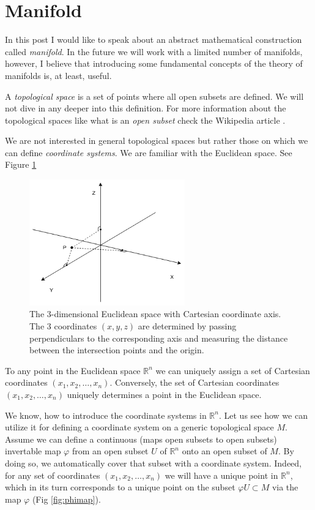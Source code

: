 \documentclass[a4paper,10pt]{article}
\title{}
\author{}
\begin{document}
\section{Manifold}

In this post I would like to speak about an abstract mathematical construction called {\it manifold}. In the future we will work with a limited number of manifolds, however, I believe that introducing some fundamental concepts of the theory of manifolds is, at least, useful. 

A {\it topological space } is a set of points where all open subsets  are defined. We will not dive in any deeper into this definition. For more information about the topological spaces like what is an {\it open subset} check the Wikipedia article \cite{topspace}. 

We are not interested in general topological spaces but rather those on which we can define {\it coordinate systems}. We are familiar with the Euclidean space. See Figure \ref{fig:3dcart}

\begin{figure}[h]
\centering
 \includegraphics[width=0.6\textwidth]{../../images/3DEuclidean.png}
 \caption{The 3-dimensional Euclidean space with Cartesian coordinate axis. The 3 coordinates $(x,y,z)$ are determined by passing perpendiculars to the corresponding axis and measuring the distance between the intersection points and the origin. }
 \label{fig:3dcart}
\end{figure}
 
To any point in the Euclidean space $\mathbb{R}^n$  we can uniquely assign a set of Cartesian coordinates $(x_1, x_2,\ldots, x_n)$. Conversely, the set of Cartesian coordinates $(x_1, x_2,\ldots, x_n)$ uniquely determines a point in the Euclidean space. 

We know, how to introduce the coordinate systems in $\mathbb{R}^n$. Let us see how we can utilize it for defining a coordinate system on a generic topological space $M$. Assume we can define a continuous (maps open subsets to open subsets) invertable map $\varphi$ from an open subset $U$ of $\mathbb{R}^n$ onto an open subset of $M$. By doing so, we automatically cover that subset with a coordinate system. Indeed, for any set of coordinates $(x_1, x_2,\ldots, x_n)$ we will have a unique point in $\mathbb{R}^n$, which in its turn corresponds to a unique point on the subset $\varphi U \subset M$ via the map $\varphi$ (Fig \ref{fig:phimap}). 
\end{document}
